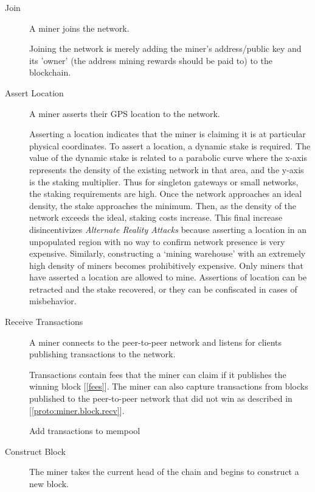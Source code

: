 \documentclass[UTF8, 10pt, nonatbib, nocopyrightspace, reprint]{sigplanconf}
\newenvironment{protocol}[2]{
  \begin{algorithm}[!htb]
    \DontPrintSemicolon
    \caption{#1}\label{#2}
}{
  \end{algorithm}
  \FloatBarrier
}
\newcommand{\protoref}[1]{[\autoref{#1}]}
\newcommand{\secref}[1]{[\autoref{#1}]}
\begin{document}
\begin{description}
  \item [Join] A miner joins the network.

    Joining the network is merely adding the miner's address/public key and its 'owner' (the address mining rewards should be paid to) to the blockchain.

  \item [Assert Location] A miner asserts their GPS location to the network.

    Asserting a location indicates that the miner is claiming it is at particular physical coordinates. To assert a location, a dynamic stake is required. The value of the dynamic stake is related to a parabolic curve where the x-axis represents the density of the existing network in that area, and the y-axis is the staking multiplier. Thus for singleton gateways or small networks, the staking requirements are high.  Once the network approaches an ideal density, the stake approaches the minimum. Then, as the density of the network exceeds the ideal, staking costs increase. This final increase disincentivizes \emph{Alternate Reality Attacks} because asserting a location in an unpopulated region with no way to confirm network presence is very expensive. Similarly, constructing a `mining warehouse' with an extremely high density of miners becomes prohibitively expensive. Only miners that have asserted a location are allowed to mine. Assertions of location can be retracted and the stake recovered, or they can be confiscated in cases of misbehavior.

  \item [Receive Transactions] A miner connects to the peer-to-peer network and listens for clients publishing transactions to the network.

    Transactions contain fees that the miner can claim if it publishes the winning block \secref{fees}. The miner can also capture transactions from blocks published to the peer-to-peer network that did not win as described in \protoref{proto:miner.block.recv}.


    \begin{protocol}{Miner Receive Transactions}{proto:miner.trans.recv}

       {
        Add transactions to mempool\;
      }
    \end{protocol}


  \item [Construct Block] The miner takes the current head of the chain and begins to construct a new block.


\end{description}
\end{document}
